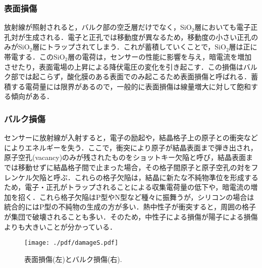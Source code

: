 \subsubsection*{表面損傷}
放射線が照射されると，バルク部の空乏層だけでなく，SiO$_{2}$層においても電子正孔対が生成される．電子と正孔では移動度が異なるため，移動度の小さい正孔のみがSiO$_{2}$層にトラップされてしまう．これが蓄積していくことで，SiO$_{2}$層は正に帯電する．このSiO$_{2}$層の電荷は，センサーの性能に影響を与え，暗電流を増加させたり，表面電場の上昇による降伏電圧の変化を引き起こす．この損傷はバルク部では起こらず，酸化膜のある表面でのみ起こるため表面損傷と呼ばれる．蓄積する電荷量には限界があるので，一般的に表面損傷は線量増大に対して飽和する傾向がある．
\subsubsection*{バルク損傷}
センサーに放射線が入射すると，電子の励起や，結晶格子上の原子との衝突などによりエネルギーを失う．ここで，衝突により原子が結晶表面まで弾き出され，原子空孔(vacancy)のみが残されたものをショットキー欠陥と呼び，結晶表面までは移動せずに結晶格子間で止まった場合，その格子間原子と原子空孔の対をフレンケル欠陥と呼ぶ．これらの格子欠陥は，結晶に新たな不純物準位を形成するため，電子・正孔がトラップされることによる収集電荷量の低下や，暗電流の増加を招く．これら格子欠陥はP型やN型など種々に振舞うが，シリコンの場合は統合的にはP型の不純物の生成の方が多い．熱中性子が衝突すると，周囲の格子が集団で破壊されることも多い．そのため，中性子による損傷が陽子による損傷よりも大きいことが分かっている．
\begin{figure}[h]
	\centering
	\texttt{[image: ./pdf/damageS.pdf]}
	\caption{表面損傷(左)とバルク損傷(右).}
	\label{fig:damageS}
\end{figure}









